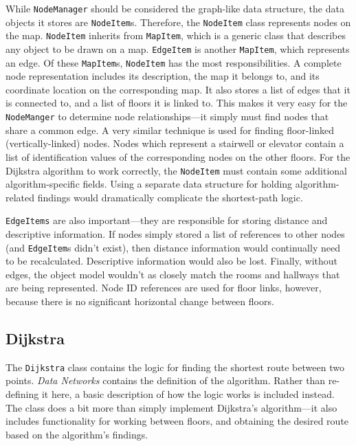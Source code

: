 \documentclass[12pt,letterpaper,titlepage]{article}   %
\begin{document}
While \texttt{NodeManager} should be considered the graph-like data structure,
the data objects it stores are \texttt{NodeItem}s. Therefore, 
the \texttt{NodeItem} class
represents nodes on the map. \texttt{NodeItem} inherits
from \texttt{MapItem}, which is a
generic class that describes any object to be drawn on a map. 
\texttt{EdgeItem} is another \texttt{MapItem}, which represents an
edge. Of these \texttt{MapItem}s, \texttt{NodeItem} has the most
responsibilities. A complete node representation
includes its description, the map it belongs to, and its coordinate
location on the corresponding map. It also stores a list of edges that
it is connected to, and a list of floors it is linked to. This makes it
very easy for the \texttt{NodeManger} to determine node
relationships---it simply
must find nodes that share a common edge. A very similar technique is
used for finding floor-linked (vertically-linked) nodes. Nodes which
represent a stairwell or elevator contain a list of identification
values of the corresponding nodes on the other floors. For the Dijkstra
algorithm to work correctly, the \texttt{NodeItem} must contain some additional
algorithm-specific fields. Using a separate data structure for holding
algorithm-related findings would dramatically complicate the
shortest-path logic.

\texttt{EdgeItems} are also important---they are responsible for
storing distance
and descriptive information. If nodes simply stored a list of references
to other nodes (and \texttt{EdgeItem}s didn't exist), then distance information
would continually need to be recalculated. Descriptive information would
also be lost. Finally, without edges, the object model wouldn't as
closely match the rooms and hallways that are being represented. Node ID
references are used for floor links, however, because there is no
significant horizontal change between floors. 

\subsection{Dijkstra}

The \texttt{Dijkstra} class contains the logic for finding the shortest route
between two points. \emph{Data Networks} contains the definition of the
algorithm. Rather than re-defining it here, a basic description of how
the logic works is included instead. The class does a bit more than
simply implement Dijkstra's algorithm---it also includes functionality
for working between floors, and obtaining the desired route based on the
algorithm's findings.
\end{document}

